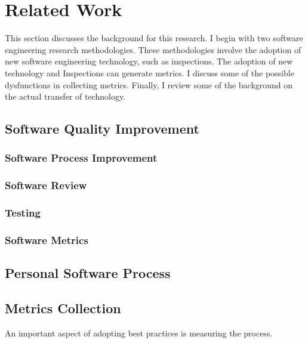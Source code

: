 \newpage
\chapter{Related Work}
\label{sec:related}

This section discusses the background for this research.  I begin with two
software engineering research methodologies.  These methodologies involve
the adoption of new software engineering technology, such as inspections.
The adoption of new technology and Inspections can generate metrics.  I
discuss some of the possible dysfunctions in collecting metrics.  Finally,
I review some of the background on the actual transfer of technology.

\section{Software Quality Improvement}
\subsection{Software Process Improvement}
\subsection{Software Review}
\subsection{Testing}
\subsection{Software Metrics}

\section{Personal Software Process}

\section{Metrics Collection}
An important aspect of adopting best practices is measuring the process.



